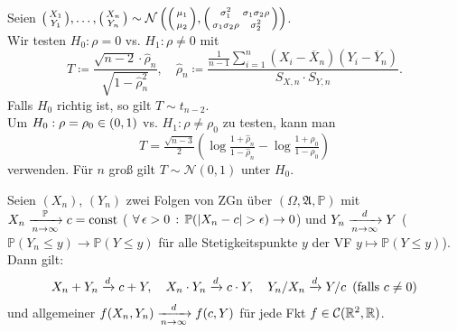 \documentclass{cheat-sheet}
\newcommand{\Alg}{\mathfrak{A}} %
\renewcommand{\P}{\mathbb{P}} %
\newcommand{\Cont}{\mathcal{C}} %
\newcommand{\Normal}{\mathcal{N}} %
\begin{document}
\begin{bsp}
  Seien $\begin{psmallmatrix} X_1 \\ Y_1 \end{psmallmatrix}, \ldots, \begin{psmallmatrix} X_n \\ Y_n \end{psmallmatrix} \sim \Normal\left(
    \begin{psmallmatrix}
      \mu_1\vphantom{\sigma_1^2} \\
      \mu_2\vphantom{\sigma_2^2}
    \end{psmallmatrix},
    \begin{psmallmatrix}
      \sigma_1^2 & \sigma_1 \sigma_2 \rho \\
      \sigma_1 \sigma_2 \rho & \sigma_2^2
    \end{psmallmatrix} \right)$. \\[2pt]
  Wir testen $H_0 : \rho = 0$ vs. $H_1 : \rho \neq 0$ mit
  \[
    T \coloneqq \frac{\sqrt{n-2} \cdot \hat{\rho}_n}{\sqrt{1 - \hat{\rho}_n^2}}, \quad
    \hat{\rho}_n \coloneqq \frac{\tfrac{1}{n-1} \sum_{i=1}^n (X_i - \overline{X}_n) (Y_i - \overline{Y}_n)}{S_{X,n} \cdot S_{Y,n}}.
  \]
  Falls $H_0$ richtig ist, so gilt $T \sim t_{n-2}$. \\[2pt]
  Um $H_0 : \rho = \rho_0 \in \left( 0, 1 \right)$ vs. $H_1 : \rho \neq \rho_0$ zu testen, kann man
  \[ T = \tfrac{\sqrt{n-3}}{2} \left( \log \tfrac{1 + \hat{\rho}_n}{1 - \hat{\rho}_n} - \log \tfrac{1+\rho_0}{1-\rho_0} \right) \]
  verwenden. Für $n$ groß gilt $T \sim \Normal(0, 1)$ unter $H_0$.
\end{bsp}


\begin{lem}
  Seien $(X_n)$, $(Y_n)$ zwei Folgen von ZGn über $(\Omega, \Alg, \P)$ mit $X_n \xra[n \to \infty]{\P} c = \text{const}$ (\dh{} $\fa{\epsilon > 0} \P(\abs{X_n - c} > \epsilon) \to 0$) und $Y_n \xrightarrow[n \to \infty]{d} Y$ (\dh{} $\P(Y_n \leq y) \to \P(Y \leq y)$ für alle Stetigkeitspunkte $y$ der VF $y \mapsto \P(Y \leq y)$). Dann gilt:
  \[
    X_n + Y_n \xrightarrow{d} c + Y, \quad
    X_n \cdot Y_n \xrightarrow{d} c \cdot Y, \quad
    Y_n / X_n \xrightarrow{d} Y / c \enspace \text{(falls $c \neq 0$)}
  \]
  und allgemeiner $f(X_n, Y_n) \xrightarrow[n \to \infty]{d} f(c, Y)$ für jede Fkt $f \in \Cont(\R^2, \R)$.
\end{lem}
\end{document}
